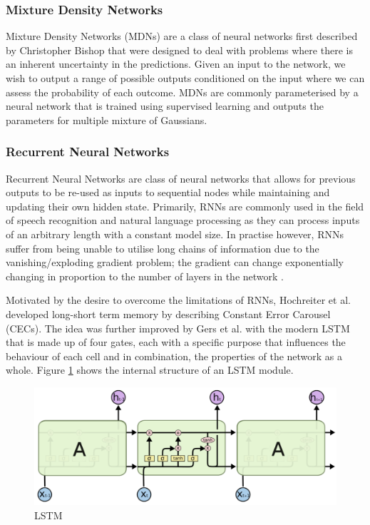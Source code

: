 \subsubsection{Mixture Density Networks}
Mixture Density Networks (MDNs) are a class of neural networks first described by Christopher Bishop \cite{bishop1994mixture} that were designed to deal with problems where there is an inherent uncertainty in the predictions. Given an input to the network, we wish to output a range of possible outputs conditioned on the input where we can assess the probability of each outcome. MDNs are commonly parameterised by a neural network that is trained using supervised learning and outputs the parameters for multiple mixture of Gaussians.

\subsubsection{Recurrent Neural Networks}
Recurrent Neural Networks are class of neural networks that allows for previous outputs to be re-used as inputs to sequential nodes while maintaining and updating their own hidden state. Primarily, RNNs are commonly used in the field of speech recognition and natural language processing as they can process inputs of an arbitrary length with a constant model size. In practise however, RNNs suffer from being unable to utilise long chains of information due to the vanishing/exploding gradient problem; the gradient can change exponentially changing in proportion to the number of layers in the network \cite{Hochreiter:01book}.

Motivated by the desire to overcome the limitations of RNNs, Hochreiter et al. \cite{hochreiter1997long} developed long-short term memory by describing Constant Error Carousel (CECs). The idea was further improved by Gers et al. \cite{gers1999learning} with the modern LSTM that is made up of four gates, each with a specific purpose that influences the behaviour of each cell and in combination, the properties of the network as a whole. Figure \ref{fig:bg:lstm} shows the internal structure of an LSTM module.

\begin{figure}[ht]
  \centering
  \includegraphics[width=0.75\columnwidth]{sections/2background/images/lstm.png}
  \caption[Structure of an unrolled LSTM]{LSTM}
  \label{fig:bg:lstm}
\end{figure}

